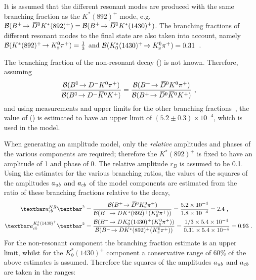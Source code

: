 It is assumed that the different resonant \Kstarp modes are produced with the same branching fraction as the $K^*(892)^+$ mode, e.g. ${\mathcal{B}}({{{B}^+}}\!\rightarrow {\ensuremath{{\kern 0.2em\overline{\kern -0.2em D}{}}{}^0}} K^*(892)^+) = {\mathcal{B}}({{{B}^+}}\!\rightarrow {\ensuremath{{\kern 0.2em\overline{\kern -0.2em D}{}}{}^0}} K^*(1430)^+)$. The branching fractions of different resonant \Kstarp modes to the \KS\pip final state are also taken into account, namely ${\mathcal{B}}(K^*(892)^+\!\rightarrow {\ensuremath{{K}^0_{\mathrm{ \scriptscriptstyle S}}}}{\ensuremath{{\pi}^+}}) = \frac{1}{3}$ and ${\mathcal{B}}(K^*_0(1430)^+\!\rightarrow {\ensuremath{{K}^0_{\mathrm{ \scriptscriptstyle S}}}}{\ensuremath{{\pi}^+}}) = 0.31$~\cite{PDG2016}.

The branching fraction of the non-resonant decay \BR(\decay{\Bp}{\Dzb\KS\pip}) is not known. Therefore, assuming
\begin{equation*}
\frac{{\mathcal{B}}({{B}^0}\!\rightarrow {\ensuremath{{D}^-}}{\ensuremath{{K}^0}}{\ensuremath{{\pi}^+}})}{{\mathcal{B}}({{B}^0}\!\rightarrow {\ensuremath{{D}^-}}{\ensuremath{{\kern 0.2em\overline{\kern -0.2em K}{}}{}^0}}{\ensuremath{{K}^+}})} = \frac{{\mathcal{B}}({{{B}^+}}\!\rightarrow {\ensuremath{{\kern 0.2em\overline{\kern -0.2em D}{}}{}^0}}{\ensuremath{{K}^0}}{\ensuremath{{\pi}^+}})}{{\mathcal{B}}({{{B}^+}}\!\rightarrow {\ensuremath{{\kern 0.2em\overline{\kern -0.2em D}{}}{}^0}}{\ensuremath{{\kern 0.2em\overline{\kern -0.2em K}{}}{}^0}}{\ensuremath{{K}^+}})} \text{ ,}
\end{equation*}
and using measurements and upper limits for the other branching fractions~\cite{PDG2014}, the value of \BR(\decay{\Bp}{\Dzb\KS\pip}) is estimated to have an upper limit of $(5.2 \pm 0.3) \times 10^{-4}$, which is used in the model.

When generating an amplitude model, only the \textit{relative} amplitudes and phases of the various components are required; therefore the $K^*(892)^+$ is fixed to have an amplitude of 1 and phase of 0. The relative amplitude $r_B$ is assumed to be 0.1. Using the estimates for the various branching ratios, the values of the squares of the amplitudes $a_{{u}{b}}$ and $a_{{c}{b}}$ of the model components are estimated from the ratio of these branching fractions relative to the  decay,
\begin{align*}
\textbar a_{\cquark\bquark}^{NR}\textbar^2 &= \frac{\BR(\decay{\Bp}{\Dzb\KS\pip})}{\BR(\decay{\Bm}{\D K^*(892)^+(\KS\pip)})} = \frac{5.2 \times 10^{-4}}{1.8 \times 10^{-4}} = 2.4 \text{ ,} \\
\textbar a_{\cquark\bquark}^{K^*_0(1430)^+}\textbar^2 &= \frac{\BR(\decay{\Bm}{\D K^*_0(1430)^+(\KS\pip)})}{\BR(\decay{\Bm}{\D K^*(892)^+(\KS\pip)})} = \frac{1/3 \times 5.4 \times 10^{-4}}{0.31 \times 5.4 \times 10^{-4}} = 0.93 \text{ .}
\end{align*}
For the non-resonant component the branching fraction estimate is an upper limit, whilst for the $K^*_0(1430)^+$  component a conservative range of 60\% of the above estimates is assumed. Therefore the squares of the amplitudes $a_{{u}{b}}$ and $a_{{c}{b}}$ are taken in the ranges:

